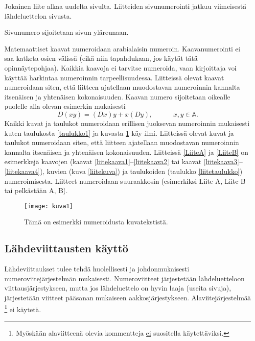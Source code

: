 \documentclass[english,12pt,a4paper,pdftex,sci,utf8]{aaltothesis}
\begin{document}
Jokainen liite alkaa uudelta sivulta. Liitteiden sivunumerointi
jatkuu viimeisest\"a l\"ahdeluettelon sivusta.

Sivunumero sijoitetaan sivun yl\"areunaan.

Matemaattiset kaavat numeroidaan arabialaisin
numeroin. Kaavanumerointi ei saa katketa osien v\"aliss\"a (eik\"a niin
tapahdukaan, jos k\"ayt\"at t\"at\"a opinn\"aytepohjaa). Kaikkia kaavoja ei tarvitse
numeroida, vaan kirjoittaja voi k\"aytt\"a\"a harkintaa numeroinnin
tarpeellisuudessa.  Liitteiss\"a olevat kaavat numeroidaan siten, ett\"a
liitteen ajatellaan muodostavan numeroinnin kannalta itsen\"aisen ja
yhten\"aisen kokonaisuuden. Kaavan numero sijoitetaan oikealle puolelle
alla olevan esimerkin mukaisesti
\begin{equation}
D(xy) = (Dx)y + x(Dy),  \hspace{3em} x,y \in \mathbb{A}.
\end{equation}
Kaikki kuvat ja taulukot numeroidaan erillisen juoksevan numeroinnin
mukaisesti kuten taulukosta \ref{taulukko1} ja kuvasta \ref{kuva1} k\"ay
ilmi.  Liitteiss\"a olevat kuvat ja taulukot numeroidaan siten, ett\"a
liitteen ajatellaan muodostavan numeroinnin kannalta itsen\"aisen ja
yhten\"aisen kokonaisuuden. Liitteiss\"a \ref{LiiteA} ja \ref{LiiteB} on
esimerkkej\"a kaavojen (kaavat \ref{liitekaava1}--\ref{liitekaava2} tai
kaavat \ref{liitekaava3}--\ref{liitekaava4}), kuvien (kuva
\ref{liitekuva}) ja taulukoiden (taulukko \ref{liitetaulukko})
numeroimisesta.  Liitteet numeroidaan suuraakkosin (esimerkiksi Liite
A, Liite B tai pelk\"ast\"a\"an A, B).
\begin{figure}[htb]
\centering \texttt{[image: kuva1]}
\caption{T\"am\"a on esimerkki numeroidusta kuvatekstist\"a. \label{kuva1}}
\end{figure}

\subsection*{L\"ahdeviittausten k\"aytt\"o}

L\"ahdeviittaukset tulee tehd\"a huolellisesti ja johdonmukaisesti
numeroviitej\"arjestelm\"an mukaisesti. Numeroviitteet j\"arjestet\"a\"an
l\"ahdeluetteloon viittausj\"arjestykseen, mutta jos l\"ahdeluettelo
on hyvin laaja (useita sivuja), j\"arjestet\"a\"an viitteet p\"a\"asanan
mukaiseen aakkosj\"arjestykseen. Alaviitej\"arjestelm\"a\"a
\footnote{My\"osk\"a\"an alaviitteen\"a olevia kommentteja \underline{ei} suositella
k\"aytett\"aviksi.} ei k\"aytet\"a.
\end{document}

